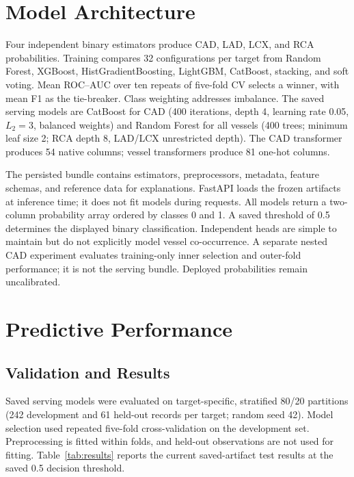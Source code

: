 \documentclass[10pt]{article}
\begin{document}
\section{Model Architecture}
Four independent binary estimators produce CAD, LAD, LCX, and RCA probabilities. Training compares 32 configurations per target from Random Forest, XGBoost, HistGradientBoosting, LightGBM, CatBoost, stacking, and soft voting. Mean ROC--AUC over ten repeats of five-fold CV selects a winner, with mean F1 as the tie-breaker. Class weighting addresses imbalance. The saved serving models are CatBoost for CAD (400 iterations, depth 4, learning rate 0.05, $L_2=3$, balanced weights) and Random Forest for all vessels (400 trees; minimum leaf size 2; RCA depth 8, LAD/LCX unrestricted depth). The CAD transformer produces 54 native columns; vessel transformers produce 81 one-hot columns.

The persisted bundle contains estimators, preprocessors, metadata, feature schemas, and reference data for explanations. FastAPI loads the frozen artifacts at inference time; it does not fit models during requests. All models return a two-column probability array ordered by classes 0 and 1. A saved threshold of 0.5 determines the displayed binary classification. Independent heads are simple to maintain but do not explicitly model vessel co-occurrence. A separate nested CAD experiment evaluates training-only inner selection and outer-fold performance; it is not the serving bundle. Deployed probabilities remain uncalibrated.

\section{Predictive Performance}
\subsection{Validation and Results}
Saved serving models were evaluated on target-specific, stratified 80/20 partitions (242 development and 61 held-out records per target; random seed 42). Model selection used repeated five-fold cross-validation on the development set. Preprocessing is fitted within folds, and held-out observations are not used for fitting. Table~\ref{tab:results} reports the current saved-artifact test results at the saved 0.5 decision threshold.
\end{document}
